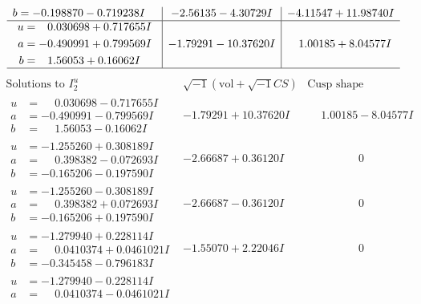 \documentclass[1p]{elsarticle_modified}
\theoremstyle{definition}
\newcommand{\I}{\sqrt{-1}}
\begin{document}
$$\begin{array}{c|c|c}
\begin{aligned}
b &= -0.198870 - 0.719238 I\end{aligned}
 & -2.56135 - 4.30729 I & -4.11547 + 11.98740 I \\ \hline\begin{aligned}
u &= \phantom{-}0.030698 + 0.717655 I \\
a &= -0.490991 + 0.799569 I \\
b &= \phantom{-}1.56053 + 0.16062 I\end{aligned}
 & -1.79291 - 10.37620 I & \phantom{-}1.00185 + 8.04577 I\\
 \hline 
 \end{array}$$\newpage$$\begin{array}{c|c|c}  
\text{Solutions to }I^u_{2}& \I (\text{vol} + \sqrt{-1}CS) & \text{Cusp shape}\\
 \hline 
\begin{aligned}
u &= \phantom{-}0.030698 - 0.717655 I \\
a &= -0.490991 - 0.799569 I \\
b &= \phantom{-}1.56053 - 0.16062 I\end{aligned}
 & -1.79291 + 10.37620 I & \phantom{-}1.00185 - 8.04577 I \\ \hline\begin{aligned}
u &= -1.255260 + 0.308189 I \\
a &= \phantom{-}0.398382 - 0.072693 I \\
b &= -0.165206 - 0.197590 I\end{aligned}
 & -2.66687 + 0.36120 I & \phantom{-0.000000 } 0 \\ \hline\begin{aligned}
u &= -1.255260 - 0.308189 I \\
a &= \phantom{-}0.398382 + 0.072693 I \\
b &= -0.165206 + 0.197590 I\end{aligned}
 & -2.66687 - 0.36120 I & \phantom{-0.000000 } 0 \\ \hline\begin{aligned}
u &= -1.279940 + 0.228114 I \\
a &= \phantom{-}0.0410374 + 0.0461021 I \\
b &= -0.345458 - 0.796183 I\end{aligned}
 & -1.55070 + 2.22046 I & \phantom{-0.000000 } 0 \\ \hline\begin{aligned}
u &= -1.279940 - 0.228114 I \\
a &= \phantom{-}0.0410374 - 0.0461021 I \\

\end{aligned}
\end{array}$$
\end{document}
